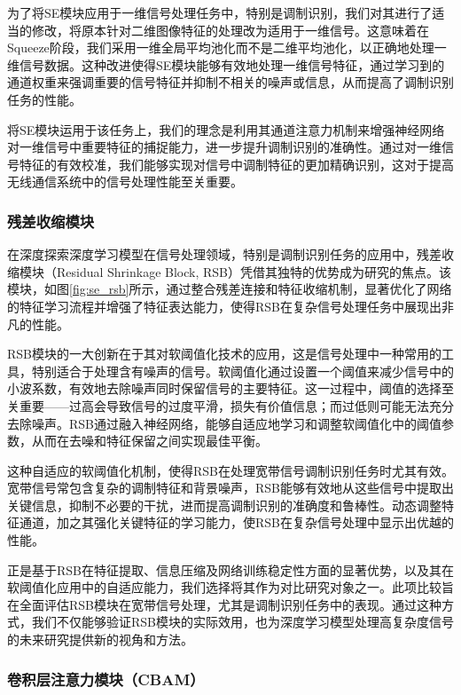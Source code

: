 为了将SE模块应用于一维信号处理任务中，特别是调制识别，我们对其进行了适当的修改，将原本针对二维图像特征的处理改为适用于一维信号。这意味着在Squeeze阶段，我们采用一维全局平均池化而不是二维平均池化，以正确地处理一维信号数据。这种改进使得SE模块能够有效地处理一维信号特征，通过学习到的通道权重来强调重要的信号特征并抑制不相关的噪声或信息，从而提高了调制识别任务的性能。

将SE模块运用于该任务上，我们的理念是利用其通道注意力机制来增强神经网络对一维信号中重要特征的捕捉能力，进一步提升调制识别的准确性。通过对一维信号特征的有效校准，我们能够实现对信号中调制特征的更加精确识别，这对于提高无线通信系统中的信号处理性能至关重要。

\subsubsection{残差收缩模块}\label{sec:background}
在深度探索深度学习模型在信号处理领域，特别是调制识别任务的应用中，残差收缩模块（Residual Shrinkage Block, RSB）凭借其独特的优势成为研究的焦点。该模块，如图\ref{fig:se_rsb}所示，通过整合残差连接和特征收缩机制，显著优化了网络的特征学习流程并增强了特征表达能力，使得RSB在复杂信号处理任务中展现出非凡的性能。

RSB模块的一大创新在于其对软阈值化技术的应用，这是信号处理中一种常用的工具，特别适合于处理含有噪声的信号。软阈值化通过设置一个阈值来减少信号中的小波系数，有效地去除噪声同时保留信号的主要特征。这一过程中，阈值的选择至关重要——过高会导致信号的过度平滑，损失有价值信息；而过低则可能无法充分去除噪声。RSB通过融入神经网络，能够自适应地学习和调整软阈值化中的阈值参数，从而在去噪和特征保留之间实现最佳平衡。

这种自适应的软阈值化机制，使得RSB在处理宽带信号调制识别任务时尤其有效。宽带信号常包含复杂的调制特征和背景噪声，RSB能够有效地从这些信号中提取出关键信息，抑制不必要的干扰，进而提高调制识别的准确度和鲁棒性。动态调整特征通道，加之其强化关键特征的学习能力，使RSB在复杂信号处理中显示出优越的性能。

正是基于RSB在特征提取、信息压缩及网络训练稳定性方面的显著优势，以及其在软阈值化应用中的自适应能力，我们选择将其作为对比研究对象之一。此项比较旨在全面评估RSB模块在宽带信号处理，尤其是调制识别任务中的表现。通过这种方式，我们不仅能够验证RSB模块的实际效用，也为深度学习模型处理高复杂度信号的未来研究提供新的视角和方法。

\subsubsection{卷积层注意力模块（CBAM）}\label{sec:background}

